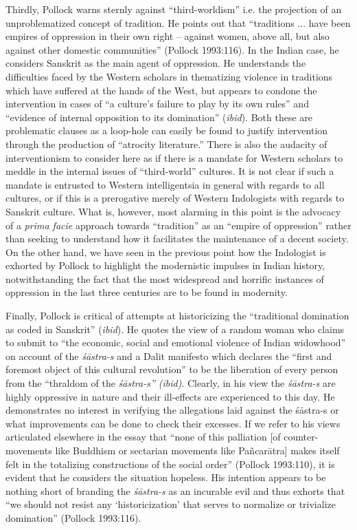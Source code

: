 Thirdly, Pollock warns sternly against “third-worldism” i.e. the projection of an unproblematized concept of tradition. He points out that “traditions $\ldots$ have been empires of oppression in their own right – against women, above all, but also against other domestic communities” (Pollock 1993:116). In the Indian case, he considers Sanskrit as the main agent of oppression. He understands the difficulties faced by the Western scholars in thematizing violence in traditions which have suffered at the hands of the West, but appears to condone the intervention in cases of “a culture’s failure to play by its own rules” and “evidence of internal opposition to its domination” ({\sl ibid}). Both these are problematic clauses as a loop-hole can easily be found to justify intervention through the production of “atrocity literature.” There is also the audacity of interventionism to consider here as if there is a mandate for Western scholars to meddle in the internal issues of “third-world” cultures. It is not clear if such a mandate is entrusted to Western intelligentsia in general with regards to all cultures, or if this is a prerogative merely of Western Indologists with regards to Sanskrit culture. What is, however, most alarming in this point is the advocacy of a {\sl prima facie} approach towards “tradition” as an “empire of oppression” rather than seeking to understand how it facilitates the maintenance of a decent society. On the other hand, we have seen in the previous point how the Indologist is exhorted by Pollock to highlight the modernistic impulses in Indian history, notwithstanding the fact that the most widespread and horrific instances of oppression in the last three centuries are to be found in modernity.

Finally, Pollock is critical of attempts at historicizing the “traditional domination as coded in Sanskrit” ({\sl ibid}). He quotes the view of a random woman who claims to submit to “the economic, social and emotional violence of Indian widowhood” on account of the {\sl śāstra-s} and a Dalit manifesto which declares the “first and foremost object of this cultural revolution” to be the liberation of every person from the “thraldom of the {\sl śāstra-s” (ibid)}. Clearly, in his view the {\sl śāstra-s} are highly oppressive in nature and their ill-effects are experienced to this day. He demonstrates no interest in verifying the allegations laid against the śāstra-s or what improvements can be done to check their excesses. If we refer to his views articulated elsewhere in the essay that “none of this palliation [of counter-movements like Buddhism or sectarian movements like Pañcarātra] makes itself felt in the totalizing constructions of the social order” (Pollock 1993:110), it is evident that he considers the situation hopeless. His intention appears to be nothing short of branding the {\sl śāstra-s} as an incurable evil and thus exhorts that “we should not resist any ‘historicization’ that serves to normalize or trivialize domination” (Pollock 1993:116).

